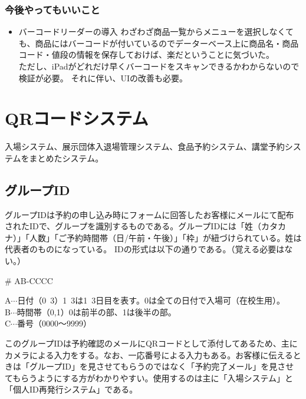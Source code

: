 \documentclass[dvipdfmx,jb5]{jreport}
\begin{document}
\subsubsection{今後やってもいいこと}
\begin{itemize}
      \item バーコードリーダーの導入
            わざわざ商品一覧からメニューを選択しなくても、商品にはバーコードが付いているのでデーターベース上に商品名・商品コード・値段の情報を保存しておけば、楽だということに気づいた。\\
            ただし、iPadがどれだけ早くバーコードをスキャンできるかわからないので検証が必要。
            それに伴い、UIの改善も必要。
\end{itemize}

\newpage
\section{QRコードシステム}
入場システム、展示団体入退場管理システム、食品予約システム、講堂予約システムをまとめたシステム。
\subsection{グループID}
グループIDは予約の申し込み時にフォームに回答したお客様にメールにて配布されたIDで、グループを識別するものである。グループIDには「姓（カタカナ）」「人数」「ご予約時間帯（日/午前・午後）」「枠」が紐づけられている。姓は代表者のものになっている。
IDの形式は以下の通りである。（覚える必要はない。）
\begin{screen}
      \begin{center}
            {\huge \# AB-CCCC}\\
      \end{center}
      A$\cdots$日付（0~3）1~3は1~3日目を表す。0は全ての日付で入場可（在校生用）。\\
      B$\cdots$時間帯（0,1）0は前半の部、1は後半の部。\\
      C$\cdots$番号（0000〜9999）
\end{screen}
このグループIDは予約確認のメールにQRコードとして添付してあるため、主にカメラによる入力をする。なお、一応番号による入力もある。お客様に伝えるときは「グループID」を見させてもらうのではなく「予約完了メール」を見させてもらうようにする方がわかりやすい。使用するのは主に「入場システム」と「個人ID再発行システム」である。
\end{document}
